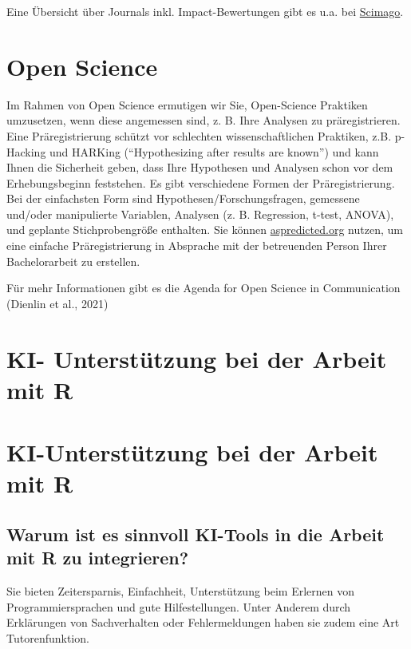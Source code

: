 \documentclass[
  letterpaper,
  DIV=11]{scrreprt}
\begin{document}
Eine Übersicht über Journals inkl. Impact-Bewertungen gibt es u.a. bei
\href{https://www.scimagojr.com/journalrank.php?category=3315&order=sjr&ord=desc}{Scimago}.

\chapter{Open Science}\label{open-science}

Im Rahmen von Open Science ermutigen wir Sie, Open-Science Praktiken
umzusetzen, wenn diese angemessen sind, z. B. Ihre Analysen zu
präregistrieren. Eine Präregistrierung schützt vor schlechten
wissenschaftlichen Praktiken, z.B. p-Hacking und HARKing
(``Hypothesizing after results are known'') und kann Ihnen die
Sicherheit geben, dass Ihre Hypothesen und Analysen schon vor dem
Erhebungsbeginn feststehen. Es gibt verschiedene Formen der
Präregistrierung. Bei der einfachsten Form sind
Hypothesen/Forschungsfragen, gemessene und/oder manipulierte Variablen,
Analysen (z. B. Regression, t-test, ANOVA), und geplante
Stichprobengröße enthalten. Sie können
\href{https://aspredicted.org}{aspredicted.org} nutzen, um eine einfache
Präregistrierung in Absprache mit der betreuenden Person Ihrer
Bachelorarbeit zu erstellen.

Für mehr Informationen gibt es die Agenda for Open Science in
Communication (Dienlin et al., 2021)

\chapter{KI- Unterstützung bei der Arbeit mit
R}\label{ki--unterstuxfctzung-bei-der-arbeit-mit-r}

\chapter{KI-Unterstützung bei der Arbeit mit
R}\label{ki-unterstuxfctzung-bei-der-arbeit-mit-r}

\section{Warum ist es sinnvoll KI-Tools in die Arbeit mit R zu
integrieren?}\label{warum-ist-es-sinnvoll-ki-tools-in-die-arbeit-mit-r-zu-integrieren}

Sie bieten Zeitersparnis, Einfachheit, Unterstützung beim Erlernen von
Programmiersprachen und gute Hilfestellungen. Unter Anderem durch
Erklärungen von Sachverhalten oder Fehlermeldungen haben sie zudem eine
Art Tutorenfunktion.
\end{document}
